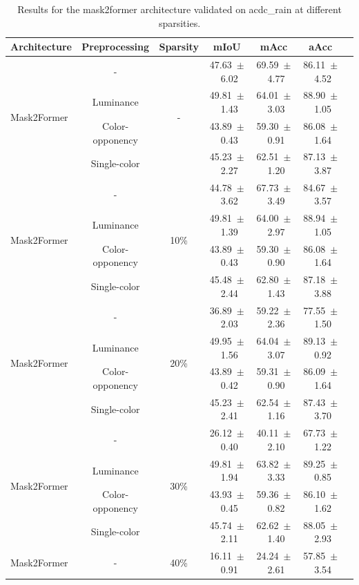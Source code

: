 \begin{table}[h]
\centering
\caption{Results for the mask2former architecture validated on acdc_rain at different sparsities.}
\begin{tabular}{@{}lccc ccc@{}}
\toprule
Architecture & Preprocessing & Sparsity & mIoU & mAcc & aAcc \\
\midrule

\multirow{4}{*}{Mask2Former} & - & \multirow{4}{*}{-} & 47.63~$\pm$~6.02 & 69.59~$\pm$~4.77 & 86.11~$\pm$~4.52 \\
& Luminance & & 49.81~$\pm$~1.43 & 64.01~$\pm$~3.03 & 88.90~$\pm$~1.05 \\
& Color-opponency & & 43.89~$\pm$~0.43 & 59.30~$\pm$~0.91 & 86.08~$\pm$~1.64 \\
& Single-color & & 45.23~$\pm$~2.27 & 62.51~$\pm$~1.20 & 87.13~$\pm$~3.87 \\
\midrule
\multirow{4}{*}{Mask2Former} & - & \multirow{4}{*}{10\%} & 44.78~$\pm$~3.62 & 67.73~$\pm$~3.49 & 84.67~$\pm$~3.57 \\
& Luminance & & 49.81~$\pm$~1.39 & 64.00~$\pm$~2.97 & 88.94~$\pm$~1.05 \\
& Color-opponency & & 43.89~$\pm$~0.43 & 59.30~$\pm$~0.90 & 86.08~$\pm$~1.64 \\
& Single-color & & 45.48~$\pm$~2.44 & 62.80~$\pm$~1.43 & 87.18~$\pm$~3.88 \\
\midrule
\multirow{4}{*}{Mask2Former} & - & \multirow{4}{*}{20\%} & 36.89~$\pm$~2.03 & 59.22~$\pm$~2.36 & 77.55~$\pm$~1.50 \\
& Luminance & & 49.95~$\pm$~1.56 & 64.04~$\pm$~3.07 & 89.13~$\pm$~0.92 \\
& Color-opponency & & 43.89~$\pm$~0.42 & 59.31~$\pm$~0.90 & 86.09~$\pm$~1.64 \\
& Single-color & & 45.23~$\pm$~2.41 & 62.54~$\pm$~1.16 & 87.43~$\pm$~3.70 \\
\midrule
\multirow{4}{*}{Mask2Former} & - & \multirow{4}{*}{30\%} & 26.12~$\pm$~0.40 & 40.11~$\pm$~2.10 & 67.73~$\pm$~1.22 \\
& Luminance & & 49.81~$\pm$~1.94 & 63.82~$\pm$~3.33 & 89.25~$\pm$~0.85 \\
& Color-opponency & & 43.93~$\pm$~0.45 & 59.36~$\pm$~0.82 & 86.10~$\pm$~1.62 \\
& Single-color & & 45.74~$\pm$~2.11 & 62.62~$\pm$~1.40 & 88.05~$\pm$~2.93 \\
\midrule
\multirow{4}{*}{Mask2Former} & - & \multirow{4}{*}{40\%} & 16.11~$\pm$~0.91 & 24.24~$\pm$~2.61 & 57.85~$\pm$~3.54 \\

\end{tabular}
\end{table}
